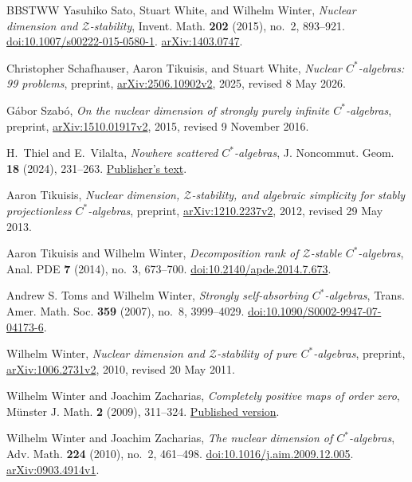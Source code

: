 \begin{thebibliography}{BBSTWW}
Yasuhiko Sato, Stuart White, and Wilhelm Winter,
\emph{Nuclear dimension and $\mathcal Z$-stability},
Invent. Math. \textbf{202} (2015), no.~2, 893--921.
\href{https://doi.org/10.1007/s00222-015-0580-1}{doi:10.1007/s00222-015-0580-1}.
\href{https://arxiv.org/abs/1403.0747}{arXiv:1403.0747}.

Christopher Schafhauser, Aaron Tikuisis, and Stuart White,
\emph{Nuclear $C^*$-algebras: 99 problems},
preprint, \href{https://arxiv.org/abs/2506.10902v2}{arXiv:2506.10902v2},
2025, revised 8 May 2026.

G\'abor Szab\'o,
\emph{On the nuclear dimension of strongly purely infinite $C^*$-algebras},
preprint, \href{https://arxiv.org/abs/1510.01917v2}{arXiv:1510.01917v2},
2015, revised 9 November 2016.

 H.~Thiel and E.~Vilalta,
\emph{Nowhere scattered \(C^*\)-algebras},
J. Noncommut. Geom. \textbf{18} (2024), 231--263.
\href{https://ems.press/content/serial-article-files/42631}{Publisher's text}.

Aaron Tikuisis,
\emph{Nuclear dimension, $\mathcal Z$-stability, and algebraic simplicity
for stably projectionless $C^*$-algebras},
preprint, \href{https://arxiv.org/abs/1210.2237v2}{arXiv:1210.2237v2},
2012, revised 29 May 2013.

Aaron Tikuisis and Wilhelm Winter,
\emph{Decomposition rank of $\mathcal Z$-stable $C^*$-algebras},
Anal. PDE \textbf{7} (2014), no.~3, 673--700.
\href{https://doi.org/10.2140/apde.2014.7.673}{doi:10.2140/apde.2014.7.673}.

Andrew S. Toms and Wilhelm Winter,
\emph{Strongly self-absorbing $C^*$-algebras},
Trans. Amer. Math. Soc. \textbf{359} (2007), no.~8, 3999--4029.
\href{https://doi.org/10.1090/S0002-9947-07-04173-6}{doi:10.1090/S0002-9947-07-04173-6}.

Wilhelm Winter,
\emph{Nuclear dimension and $\mathcal Z$-stability of pure $C^*$-algebras},
preprint, \href{https://arxiv.org/abs/1006.2731v2}{arXiv:1006.2731v2},
2010, revised 20 May 2011.

Wilhelm Winter and Joachim Zacharias,
\emph{Completely positive maps of order zero},
M\"unster J. Math. \textbf{2} (2009), 311--324.
\href{https://www.uni-muenster.de/FB10/mjm/vol_2/mjm_vol_2_14.pdf}{Published version}.

Wilhelm Winter and Joachim Zacharias,
\emph{The nuclear dimension of $C^*$-algebras},
Adv. Math. \textbf{224} (2010), no.~2, 461--498.
\href{https://doi.org/10.1016/j.aim.2009.12.005}{doi:10.1016/j.aim.2009.12.005}.
\href{https://arxiv.org/abs/0903.4914v1}{arXiv:0903.4914v1}.

\end{thebibliography}
